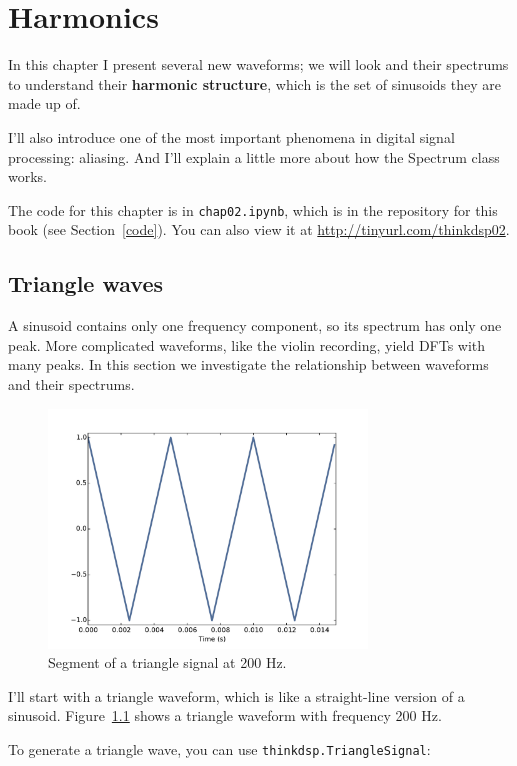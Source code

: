 \documentclass[12pt]{book}
\begin{document}
\chapter{Harmonics}
\label{harmonics}

In this chapter I present several new waveforms; we will look and
their spectrums to understand their {\bf harmonic structure}, which is
the set of sinusoids they are made up of.

I'll also introduce one of the most important phenomena in digital
signal processing: aliasing.  And I'll explain a little more about how
the Spectrum class works.

The code for this chapter is in {\tt chap02.ipynb}, which is in the
repository for this book (see Section~\ref{code}).
You can also view it at \url{http://tinyurl.com/thinkdsp02}.


\section{Triangle waves}
\label{triangle}

A sinusoid contains only one frequency component, so its spectrum
has only one peak.  More complicated waveforms, like the
violin recording, yield DFTs with many peaks.  In this section we
investigate the relationship between waveforms and their spectrums.

\begin{figure}
\centerline{\includegraphics[height=2.5in]{figs/triangle-200-1.pdf}}
\caption{Segment of a triangle signal at 200 Hz.}
\label{fig.triangle.200.1}
\end{figure}

I'll start with a triangle waveform, which is like a straight-line
version of a sinusoid.  Figure~\ref{fig.triangle.200.1} shows a
triangle waveform with frequency 200 Hz.

To generate a triangle wave, you can use {\tt thinkdsp.TriangleSignal}:
\end{document}

